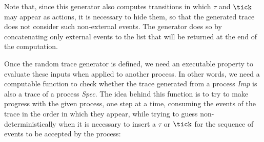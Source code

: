 Note that, since this generator also computes transitions in which $ \tau $ and $ \tick $ may appear as actions, it is necessary to hide them, so that the generated trace does not consider such non-external events. The generator  does so by concatenating only external events to the list that will be returned at the end of the computation.

Once the random trace generator is defined, we need an executable property to evaluate these inputs when applied to another process. In other words, we need a computable function to check whether the trace generated from a process \emph{Imp} is also a trace of a process \emph{Spec}. The idea behind this function is to try to make progress with the given process, one step at a time, consuming the events of the trace in the order in which they appear, while trying to guess non-deterministically when it is necessary to insert a $ \tau $ or $ \tick $ for the sequence of events to be accepted by the process:

